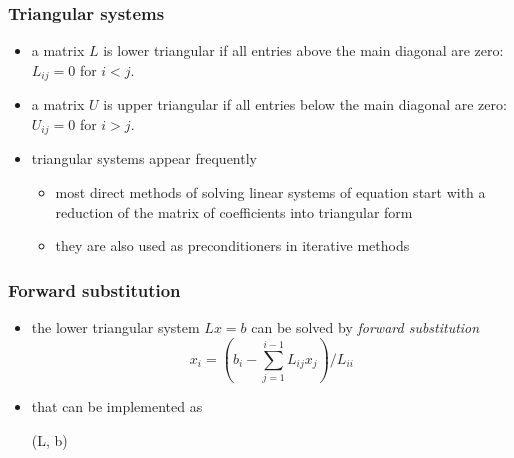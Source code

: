 %
%
%
%


\begin{frame}[fragile]
%
  \frametitle{Triangular systems}
%
  \begin{itemize}
%
  \item a matrix $L$ is lower triangular if all entries above the main diagonal are zero: $L_{ij} =
    0$ for $i < j$.
  \item a matrix $U$ is upper triangular if all entries below the main diagonal are zero: $U_{ij} =
    0$ for $i > j$.
  \item triangular systems appear frequently
    \begin{itemize}
    \item most direct methods of solving linear systems of equation start with a reduction of
      the matrix of coefficients into triangular form
    \item they are also used as preconditioners in iterative methods
    \end{itemize}
%
  \end{itemize}
%
\end{frame}

\begin{frame}[fragile]
%
  \frametitle{Forward substitution}
%
  \begin{itemize}
%
  \item the lower triangular system $Lx = b$ can be solved by {\em forward substitution}
    \begin{equation}
      x_{i} = \left( b_{i} - \sum_{j=1}^{i-1} L_{ij}x_{j} \right) / L_{ii}
    \end{equation}
%
  \item that can be implemented as
    \begin{center}
      \begin{minipage}{.85\linewidth}
        \begin{algorithm}[H]
          \label{alg:forward-substitution}
%
          \dontprintsemicolon
          \setalcaphskip{0ex}
%
          \caption{\forwsub(L, b)}
%
%
        \end{algorithm}
      \end{minipage}
    \end{center}
%
  \end{itemize}
%
\end{frame}

